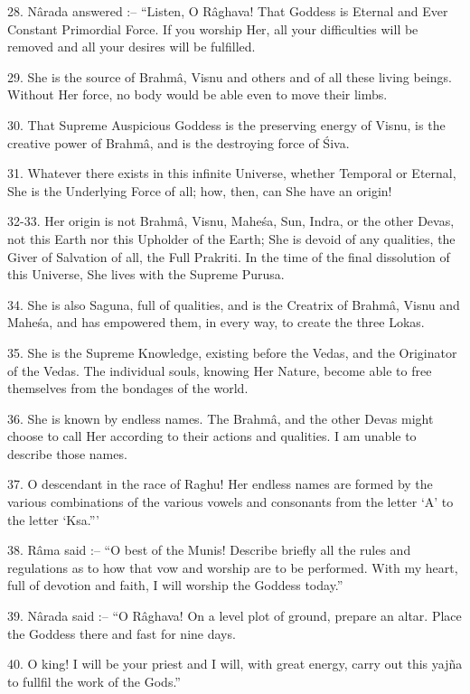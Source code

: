 28. N\^arada answered :-- ``Listen, O R\^aghava! That Goddess is Eternal and Ever Constant Primordial Force. If you worship Her, all your difficulties will be removed and all your desires will be fulfilled.

29. She is the source of Brahm\^a, Visnu and others and of all these living beings. Without Her force, no body would be able even to move their limbs.

30. That Supreme Auspicious Goddess is the preserving energy of Visnu, is the creative power of Brahm\^a, and is the destroying force of \'Siva.

31. Whatever there exists in this infinite Universe, whether Temporal or Eternal, She is the Underlying Force of all; how, then, can She have an origin!

32-33. Her origin is not Brahm\^a, Visnu, Mahe\'sa, Sun, Indra, or the other Devas, not this Earth nor this Upholder of the Earth; She is devoid of any qualities, the Giver of Salvation of all, the Full Prakriti. In the time of the final dissolution of this Universe, She lives with the Supreme Purusa.

34. She is also Saguna, full of qualities, and is the Creatrix of Brahm\^a, Visnu and Mahe\'sa, and has empowered them, in every way, to create the three Lokas.

35. She is the Supreme Knowledge, existing before the Vedas, and the Originator of the Vedas. The individual souls, knowing Her Nature, become able to free themselves from the bondages of the world.

36. She is known by endless names. The Brahm\^a, and the other Devas might choose to call Her according to their actions and qualities. I am unable to describe those names.

37. O descendant in the race of Raghu! Her endless names are formed by the various combinations of the various vowels and consonants from the letter ‘A' to the letter ‘Ksa.'''

38. R\^ama said :-- ``O best of the Munis! Describe briefly all the rules and regulations as to how that vow and worship are to be performed. With my heart, full of devotion and faith, I will worship the Goddess today.''

39. N\^arada said :-- ``O R\^aghava! On a level plot of ground, prepare an altar. Place the Goddess there and fast for nine days.

40. O king! I will be your priest and I will, with great energy, carry out this yaj\~na to fullfil the work of the Gods.''

